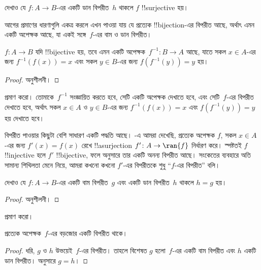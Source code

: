 \documentclass[../../../include/open-logic-section]{subfiles}
\begin{document}
\begin{prob}
দেখাও যে $f\colon A \to B$-এর একটি ডান বিপরীত~$h$ থাকলে $f$ !!{surjective} হয়।
\end{prob}

\begin{explain}
  আগের প্রমাণের ধারণাগুলি একত্র করলে এখন পাওয়া যায় যে প্রত্যেক !!{bijection}-এর বিপরীত আছে, অর্থাৎ এমন একটি অপেক্ষক আছে, যা একই সঙ্গে~$f$-এর বাম ও ডান বিপরীত।
\end{explain}

\begin{prop}
$f\colon A \to B$ যদি !!{bijective} হয়, তবে এমন একটি অপেক্ষক~$f^{-1}\colon B \to A$ আছে, যাতে সকল $x \in A$-এর জন্য $f^{-1}(f(x)) = x$ এবং সকল $y \in B$-এর জন্য $f(f^{-1}(y)) = y$ হয়।
\end{prop}

\begin{proof}
অনুশীলনী।
\end{proof}

\begin{prob}
 প্রমাণ করো। তোমাকে~$f^{-1}$ সংজ্ঞায়িত করতে হবে, সেটি একটি অপেক্ষক দেখাতে হবে, এবং সেটি~$f$-এর বিপরীত দেখাতে হবে, অর্থাৎ সকল $x \in A$ ও $y \in B$-এর জন্য $f^{-1}(f(x)) = x$ এবং $f(f^{-1}(y)) = y$ হয় দেখাতে হবে।
\end{prob}

\begin{explain}
বিপরীত পাওয়ার কিছুটা বেশি সাধারণ একটি পদ্ধতি আছে। -এ আমরা দেখেছি, প্রত্যেক অপেক্ষক $f$, সকল $x \in A$-এর জন্য $f'(x) = f(x)$ রেখে !!a{surjection} $f'
\colon A \to \ran{f}$ নির্ধারণ করে। স্পষ্টতই $f$ !!{injective} হলে $f'$ !!{bijective}, ফলে  অনুসারে তার একটি অনন্য বিপরীত আছে। সংকেতের ব্যবহারে অতি সামান্য শিথিলতা মেনে নিয়ে, আমরা কখনো কখনো $f'$-এর বিপরীতকে শুধু ``$f$-এর বিপরীত'' বলি।
\end{explain}

\begin{prop}%
  দেখাও যে $f\colon A \to B$-এর একটি বাম বিপরীত~$g$ এবং একটি ডান বিপরীত~$h$ থাকলে $h = g$ হয়।
\end{prop}

\begin{proof}
  অনুশীলনী।
\end{proof}

\begin{prob}
   প্রমাণ করো।
\end{prob}

\begin{prop}
প্রত্যেক অপেক্ষক~$f$-এর বড়জোর একটি বিপরীত থাকে।
\end{prop}

\begin{proof}
  ধরি, $g$ ও $h$ উভয়েই~$f$-এর বিপরীত। তাহলে বিশেষত $g$ হলো~$f$-এর একটি বাম বিপরীত এবং $h$ একটি ডান বিপরীত।  অনুসারে $g = h$।
\end{proof}
\end{document}
